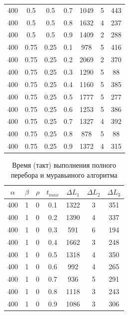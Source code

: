 \documentclass[a4paper,oneside,14pt]{extreport}
\begin{document}
\begin{table}[h]
\begin{center}
\begin{tabular}{|c|c|c|c|c|c|c|}
		400 & 0.5 & 0.5 & 0.7 & 1049 & 5 & 443 \\
		400 & 0.5 & 0.5 & 0.8 & 1632 & 4 & 237 \\
		400 & 0.5 & 0.5 & 0.9 & 1409 & 2 & 288 \\
		400 & 0.75 & 0.25 & 0.1 & 978 & 5 & 416 \\
		400 & 0.75 & 0.25 & 0.2 & 2069 & 2 & 370 \\
		400 & 0.75 & 0.25 & 0.3 & 1290 & 5 & 88 \\
		400 & 0.75 & 0.25 & 0.4 & 1160 & 5 & 385 \\
		400 & 0.75 & 0.25 & 0.5 & 1777 & 5 & 277 \\
		400 & 0.75 & 0.25 & 0.6 & 1253 & 5 & 386 \\
		400 & 0.75 & 0.25 & 0.7 & 1327 & 4 & 392 \\
		400 & 0.75 & 0.25 & 0.8 & 878 & 5 & 88 \\
		400 & 0.75 & 0.25 & 0.9 & 1372 & 4 & 315 \\	
		\hline
	\end{tabular}
\end{center}
\end{table}
\begin{table}[h]
\caption{Время (такт) выполнения полного перебора и муравьиного алгоритма}
\label{tbl:only}
\begin{center}
	\begin{tabular}{|c|c|c|c|c|c|c|}
		\hline
		$\alpha$ & $\beta$ & $\rho$ &  $t_{max}$ & $\Delta L_{1}$ & $\Delta L_{2}$ & $\Delta L_{3}$\\
		\hline
		400 & 1 & 0 & 0.1 & 1322 & 3 & 351 \\
		400 & 1 & 0 & 0.2 & 1390 & 4 & 337 \\
		400 & 1 & 0 & 0.3 & 591 & 6 & 194 \\
		400 & 1 & 0 & 0.4 & 1662 & 3 & 248 \\
		400 & 1 & 0 & 0.5 & 1318 & 4 & 350 \\
		400 & 1 & 0 & 0.6 & 992 & 4 & 265 \\
		400 & 1 & 0 & 0.7 & 936 & 5 & 291 \\
		400 & 1 & 0 & 0.8 & 1118 & 3 & 243 \\
		400 & 1 & 0 & 0.9 & 1086 & 3 & 306 \\ 
		\hline 	
	\end{tabular}
\end{center}
\end{table}
\end{document}
